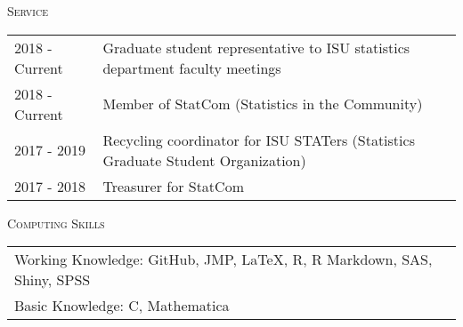 \documentclass[10pt, oneside]{article}
\begin{document}
\noindent \textsc{Service} \hrulefill
\begin{longtable}{p{2.5cm}p{14cm}}
\hfill{2018 - Current} & Graduate student representative to ISU statistics department faculty meetings\\
\hfill{2018 - Current} & Member of StatCom (Statistics in the Community)\\
\hfill{2017 - 2019} & Recycling coordinator for ISU STATers (Statistics Graduate Student Organization)\\
\hfill{2017 - 2018} & Treasurer for StatCom
\end{longtable}

\noindent \textsc{Computing Skills} \hrulefill
\begin{longtable}{p{16.5cm}}
Working Knowledge: GitHub, JMP, \LaTeX, R, R Markdown, SAS, Shiny, SPSS\\
Basic Knowledge: C, Mathematica
\end{longtable}
\end{document}
